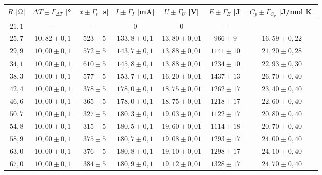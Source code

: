 \begin{table}
[H]
\begin{tabular}{ccccccc}

  \toprule
$R$ [$\si{\ohm}$] & $\Delta{T}\pm\Gamma_{\Delta{T}}$ [°] & $t \pm \Gamma_t$ [s] & $I \pm \Gamma_I$ [mA] & $U \pm \Gamma_U$ [V] & $E \pm \Gamma_E$ [J] & $C_p \pm \Gamma_{C_p} $ [J/mol K]\\

\midrule
$21,1$ & $-            $ & $ -       $ & $0            $ & $0             $ & $-$           & $-$ \\

$25,7$ & $10,82 \pm 0,1$ & $523 \pm 5$ & $133,8 \pm 0,1$ & $13,80 \pm 0,01$ & $ 966 \pm  9$ & $16,59 \pm 0,22$ \\

$29,9$ & $10,00 \pm 0,1$ & $572 \pm 5$ & $143,7 \pm 0,1$ & $13,88 \pm 0,01$ & $1141 \pm 10$ & $21,20 \pm 0,28$ \\
$34,1$ & $10,00 \pm 0,1$ & $610 \pm 5$ & $145,8 \pm 0,1$ & $13,88 \pm 0,01$ & $1234 \pm 10$ & $22,93 \pm 0,30$ \\
$38,3$ & $10,00 \pm 0,1$ & $577 \pm 5$ & $153,7 \pm 0,1$ & $16,20 \pm 0,01$ & $1437 \pm 13$ & $26,70 \pm 0,40$ \\

$42,4$ & $10,00 \pm 0,1$ & $378 \pm 5$ & $178,0 \pm 0,1$ & $18,75 \pm 0,01$ & $1262 \pm 17$ & $23,40 \pm 0,40$ \\

$46,6$ & $10,00 \pm 0,1$ & $365 \pm 5$ & $178,0 \pm 0,1$ & $18,75 \pm 0,01$ & $1218 \pm 17$ & $22,60 \pm 0,40$ \\

$50,7$ & $10,00 \pm 0,1$ & $327 \pm 5$ & $180,3 \pm 0,1$ & $19,03 \pm 0,01$ & $1122 \pm 17$ & $20,80 \pm 0,40$ \\

$54,8$ & $10,00 \pm 0,1$ & $315 \pm 5$ & $180,5 \pm 0,1$ & $19,60 \pm 0,01$ & $1114 \pm 18$ & $20,70 \pm 0,40$ \\

$58,9$ & $10,00 \pm 0,1$ & $375 \pm 5$ & $180,7 \pm 0,1$ & $19,08 \pm 0,01$ & $1293 \pm 17$ & $24,00 \pm 0,40$ \\

$63,0$ & $10,00 \pm 0,1$ & $376 \pm 5$ & $180,8 \pm 0,1$ & $19,10 \pm 0,01$ & $1298 \pm 17$ & $24,10 \pm 0,40$ \\

$67,0$ & $10,00 \pm 0,1$ & $384 \pm 5$ & $180,9 \pm 0,1$ & $19,12 \pm 0,01$ & $1328 \pm 17$ & $24,70 \pm 0,40$ \\


\end{tabular}
\end{table}

